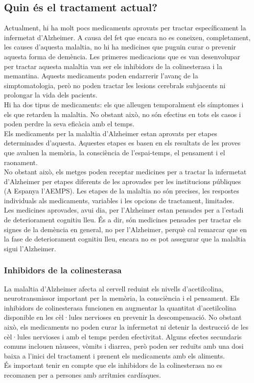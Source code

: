 \documentclass[a4paper,12pt]{article}
\begin{document}
\subsection*{Quin és el tractament actual?}
Actualment, hi ha molt pocs medicaments aprovats per tractar específicament la infermetat d'Alzheimer. A causa del fet que encara no es coneixen, completament, les causes d'aquesta malaltia, no hi ha medicines que puguin curar o prevenir aquesta forma de demència. Les primeres medicacions que es van desenvolupar per tractar aquesta malaltia van ser els inhibidors de la colinesterasa i la memantina. Aquests medicaments poden endarrerir l'avanç de la simptomatologia, però no poden tractar les lesions cerebrals subjacents ni prolongar la vida dels pacients.\\
Hi ha dos tipus de medicaments: els que alleugen temporalment els símptomes i els que retarden la malaltia. No obstant això, no són efectius en tots els casos i poden perdre la seva eficàcia amb el temps.\\
Els medicaments per la malaltia d'Alzheimer estan aprovats per etapes determinades d'aquesta. Aquestes etapes es basen en els resultats de les proves que avaluen la memòria, la consciència de l'espai-temps, el pensament i el raonament.\\
No obstant això, els metges poden receptar medicines per a tractar la infermetat d'Alzheimer per etapes diferents de les aprovades per les institucions públiques (A Espanya l'AEMPS). Les etapes de la malaltia no són precises, les respostes individuals als medicaments, variables i les opcions de tractament, limitades.\\
Les medicines aprovades, avui dia, per l'Alzheimer estan pensades per a l'estadi de deteriorament cognitiu lleu. És a dir, són medicines pensades per tractar els signes de la demència en general, no per l'Alzheimer, perquè cal remarcar que en la fase de deteriorament cognitiu lleu, encara no es pot assegurar que la malaltia sigui l'Alzheimer.\\
\subsubsection*{Inhibidors de la colinesterasa}
La malaltia d'Alzheimer afecta al cervell reduint els nivells d'acetilcolina, neurotransmissor important per la memòria, la consciència i el pensament. Els inhibidors de colinesterasa funcionen en augmentar la quantitat d'acetilcolina disponible en les cèl·lules nervioses en prevenir la descompensació. No obstant això, els medicaments no poden curar la infermetat ni detenir la destrucció de les cèl·lules nervioses i amb el temps perden efectivitat. Alguns efectes secundaris comuns inclouen nàusees, vòmits i diarrea, però poden ser reduïts amb una dosi baixa a l'inici del tractament i prenent els medicaments amb els aliments.\\
És important tenir en compte que els inhibidors de la colinesterasa no es recomanen per a persones amb arrítmies cardíaques.
\end{document}

